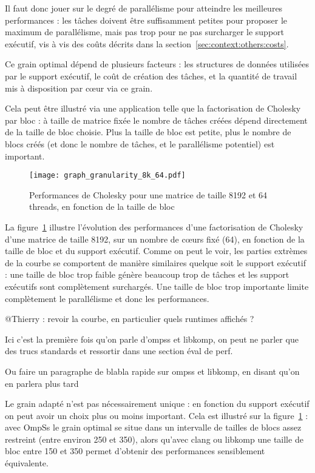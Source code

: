 Il faut donc jouer sur le degré de parallélisme pour atteindre les meilleures performances : les tâches doivent être suffisamment petites pour proposer le maximum de parallélisme, mais pas trop pour ne pas surcharger le support exécutif, vis à vis des coûts décrits dans la section~\ref{sec:context:others:costs}.

Ce grain optimal dépend de plusieurs facteurs : les structures de données utilisées par le support exécutif, le coût de création des tâches, et la quantité de travail mis à disposition par cœur via ce grain.

Cela peut être illustré via une application telle que la factorisation de Cholesky par bloc : à taille de matrice fixée le nombre de tâches créées dépend directement de la taille de bloc choisie.
Plus la taille de bloc est petite, plus le nombre de blocs créés (et donc le nombre de tâches, et le parallélisme potentiel) est important.

\begin{figure}[ht]
  \centering
  \texttt{[image: graph\_granularity\_8k\_64.pdf]}
  \caption{Performances de Cholesky pour une matrice de taille 8192 et 64 threads, en fonction de la taille de bloc}\label{fig:context:granularity}
\end{figure}

La figure~\ref{fig:context:granularity} illustre l'évolution des performances d'une factorisation de Cholesky d'une matrice de taille 8192, sur un nombre de cœurs fixé (64), en fonction de la taille de bloc et du support exécutif.
Comme on peut le voir, les parties extrèmes de la courbe se comportent de manière similaires quelque soit le support exécutif : une taille de bloc trop faible génère beaucoup trop de tâches et les support exécutifs sont complètement surchargés. Une taille de bloc trop importante limite complètement le parallélisme et donc les performances.

\begin{todo}
  @Thierry : revoir la courbe, en particulier quels runtimes affichés ?

  Ici c'est la première fois qu'on parle d'ompss et libkomp, on peut ne parler que des trucs standards et ressortir dans une section éval de perf.

  Ou faire un paragraphe de blabla rapide sur ompss et libkomp, en disant qu'on en parlera plus tard
\end{todo}

Le grain adapté n'est pas nécessairement unique : en fonction du support exécutif on peut avoir un choix plus ou moins important. Cela est illustré sur la figure~\ref{fig:context:granularity} : avec OmpSs le grain optimal se situe dans un intervalle de tailles de blocs assez restreint (entre environ 250 et 350), alors qu'avec clang ou libkomp une taille de bloc entre 150 et 350 permet d'obtenir des performances sensiblement équivalente.

